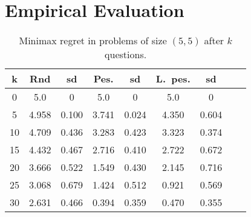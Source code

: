 
\section{Empirical Evaluation} 
\label{sec:experiments}

\begin{table}
	\begin{center}
		\begin{tabular}{S[table-figures-integer=2, table-number-alignment = right, table-figures-decimal=0]S[table-number-alignment = right]@{ ± }S[table-number-alignment = left]S[table-number-alignment = right]@{ ± }S[table-number-alignment = left]S[table-number-alignment = right]@{ ± }S[table-number-alignment = left]S[table-number-alignment = right]@{ ± }S[table-number-alignment = left]}
			\toprule
			{k} & {Rnd} & {sd} & {Pes.} & {sd} & {L.\ pes.} & {sd} \\
			 & 5.0 & 0 & 5.0 & 0 & 5.0 & 0\\
			5 & 4.958 & 0.100 & 3.741 & 0.024 & 4.350 & 0.604\\
			10 & 4.709 & 0.436 & 3.283 & 0.423 & 3.323 & 0.374\\
			15 & 4.432 & 0.467 & 2.716 &0.410 & 2.722 & 0.672\\
			20 & 3.666 & 0.522 & 1.549 & 0.430 & 2.145 & 0.716\\
			25 & 3.068 & 0.679 & 1.424 &  0.512 & 0.921 & 0.569\\
			30 & 2.631 & 0.466 & 0.394 & 0.359 & 0.470 & 0.355\\
			\bottomrule
		\end{tabular}
	\end{center}
	\caption{Minimax regret in problems of size $(5, 5)$ after $k$ questions.}
	\label{fig:55}
\end{table}

